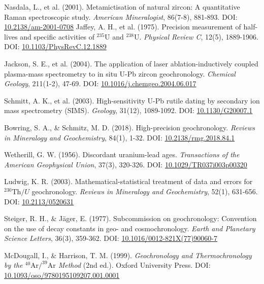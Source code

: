 \documentclass{article}
\begin{document}
\begin{thebibliography}{9}
Nasdala, L., et al. (2001). Metamictisation of natural zircon: A quantitative Raman spectroscopic study. \textit{American Mineralogist}, 86(7-8), 881-893.
DOI: \href{https://doi.org/10.2138/am-2001-0708}{10.2138/am-2001-0708}
Jaffey, A. H., et al. (1975). Precision measurement of half-lives and specific activities of \(^{235}\text{U}\) and \(^{238}\text{U}\). \textit{Physical Review C}, 12(5), 1889-1906.  
DOI: \href{https://doi.org/10.1103/PhysRevC.12.1889}{10.1103/PhysRevC.12.1889}

Jackson, S. E., et al. (2004). The application of laser ablation-inductively coupled plasma-mass spectrometry to in situ U-Pb zircon geochronology. \textit{Chemical Geology}, 211(1-2), 47-69.  
DOI: \href{https://doi.org/10.1016/j.chemgeo.2004.06.017}{10.1016/j.chemgeo.2004.06.017}

Schmitt, A. K., et al. (2003). High-sensitivity U-Pb rutile dating by secondary ion mass spectrometry (SIMS). \textit{Geology}, 31(12), 1089-1092.  
DOI: \href{https://doi.org/10.1130/G20007.1}{10.1130/G20007.1}

Bowring, S. A., \& Schmitz, M. D. (2018). High-precision geochronology. \textit{Reviews in Mineralogy and Geochemistry}, 84(1), 1-32.  
DOI: \href{https://doi.org/10.2138/rmg.2018.84.1}{10.2138/rmg.2018.84.1}

Wetherill, G. W. (1956). Discordant uranium-lead ages. \textit{Transactions of the American Geophysical Union}, 37(3), 320-326.  
DOI: \href{https://doi.org/10.1029/TR037i003p00320}{10.1029/TR037i003p00320}


Ludwig, K. R. (2003). Mathematical-statistical treatment of data and errors for \(^{230}\text{Th}/U\) geochronology. \textit{Reviews in Mineralogy and Geochemistry}, 52(1), 631-656.  
DOI: \href{https://doi.org/10.2113/0520631}{10.2113/0520631}

Steiger, R. H., \& Jäger, E. (1977). Subcommission on geochronology: Convention on the use of decay constants in geo- and cosmochronology. \textit{Earth and Planetary Science Letters}, 36(3), 359-362.  
DOI: \href{https://doi.org/10.1016/0012-821X(77)90060-7}{10.1016/0012-821X(77)90060-7}

McDougall, I., \& Harrison, T. M. (1999). \textit{Geochronology and Thermochronology by the \(^{40}\text{Ar}/^{39}\text{Ar}\) Method} (2nd ed.). Oxford University Press.  
DOI: \href{https://doi.org/10.1093/oso/9780195109207.001.0001}{10.1093/oso/9780195109207.001.0001}


\end{thebibliography}
\end{document}
